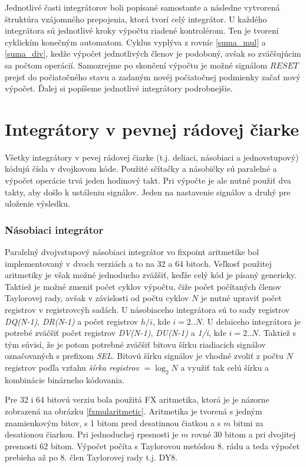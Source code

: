 Jednotlivé časti integrátorov boli popísané samostante a následne vytvorená štruktúra vzájomného prepojenia, ktorá tvorí celý integrátor. U každého integrátora sú jednotlivé kroky výpočtu riadené kontrolérom. Ten je tvorení cyklickím konečným automatom. Cyklus vyplýva z rovníc \eqref{suma_mul} a \eqref{suma_div}, kedže výpočet jednotlivých členov je podoboný, avšak so zväčšujúcim sa počtom operácií. Samozrejme po skončení výpočtu je možné signálom $ RESET $ prejsť do počiatočného stavu a zadaným novéj počiatočnej podmienky začať nový výpočet. Ďalej si popíšeme jednotlivé integrátory podrobnejšie.

\section{Integrátory v pevnej rádovej čiarke}
Všetky integrátory v pevej rádovej čiarke (t.j. deliaci, násobiaci a jednovstupový) kódujú čísla v dvojkovom kóde. Použité sčítačky a násobičky sú paralelné a výpočet operácie trvá jeden hodinový takt. Pri výpočte je ale nutné použiť dva takty, aby došlo k ustáleniu signálov. Jeden na nastavenie signálov a druhý pre uloženie výsledku.

\subsubsection*{Násobiaci integrátor}

Paralelný dvojvstupový násobiaci integrátor vo fixpoint aritmetike bol implementovaný v dvoch verziách a to na 32 a 64 bitoch. Veľkosť použitej aritmetiky je však možné jednoducho zväžšiť, keďže celý kód je písaný genericky. Taktiež je možné zmeniť počet cyklov výpočtu, čiže počet počítaných členov Taylorovej rady, avšak v závislosti od počtu cyklov $ N $ je nutné upraviť počet registrov v registrovcýh sadách. U násobiaceho integrátora sú to sady registrov \textit{DQ(N-1)}, \textit{DR(N-1)} a počet registrov $ h/i $, kde $ i = 2..N $. U delaiceho integrátora je potrebé zväčšiť počet registrov \textit{DV(N-1)}, \textit{DU(N-1)} a \textit{1/i}, kde $ i = 2..N $. Taktiež s tým súvisí, že je potom potrebné zväčšiť bitovu šírku riadiacich signálov označovaných s prefixom \textit{SEL}. Bitovú šírku signálov je vhodné zvoliť z počtu $ N $ registrov podľa vzťahu \textit{šírka registrov} $ = \log_{2} N $ a využiť tak celú šírku a kombinácie binárneho kódovania.

Pre 32 i 64 bitovú verziu bola použitá FX aritmetika, ktorá je je názorne zobrazená na obrázku \ref{fxmularitmetic}. Aritmetika je tvorená s jedným znamienkovým bitov, s 1 bitom pred desatinnou čiatkou a s $ m $ bitmi za desationou čiarkou. Pri jednoduchej rpesnosti je $ m $ rovné 30 bitom a pri dvojitej presnosti 62 bitom. Výpočet počíta s Taylorovou metódou 8. rádu a teda výpočet prebieha až po 8. člen Taylorovej rady t.j. DY8.

